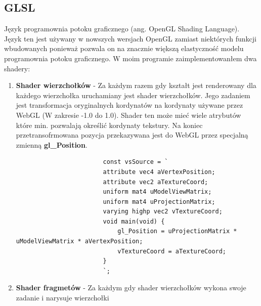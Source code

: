 \documentclass{article}
\begin{document}
        \subsection{GLSL}
            Język programownia potoku graficznego (ang. OpenGL Shading Language). Język ten jest używany w nowszych 
            wersjach OpenGL zamiast niektórych funkcji wbudowanych ponieważ pozwala on na znacznie większą elastyczność
            modelu programownia potoku graficznego. W moim programie zaimplementowanłem dwa shadery:
            \begin{enumerate}
                \item \textbf{Shader wierzchołków} - Za każdym razem gdy kształt jest renderowany dla każdego wierzchołka
                uruchamiany jest shader wierzchołków. Jego zadaniem jest transformacja oryginalnych kordynatów na kordynaty 
                używane przez WebGL (W zakresie -1.0 do 1.0). Shader ten może mieć wiele atrybutów które min. pozwalają 
                określić kordynaty tekstury. Na koniec przetransofrmowana pozycja przekazywana jest do WebGL przez specjalną
                zmienną \textbf{gl\_Position}.
                \begin{frame}
                    \scriptsize
                    \begin{verbatim}
                        const vsSource = `
                        attribute vec4 aVertexPosition;
                        attribute vec2 aTextureCoord;
                        uniform mat4 uModelViewMatrix;
                        uniform mat4 uProjectionMatrix;
                        varying highp vec2 vTextureCoord;
                        void main(void) {
                            gl_Position = uProjectionMatrix * uModelViewMatrix * aVertexPosition;
                            vTextureCoord = aTextureCoord;
                        }
                        `;
                    \end{verbatim}
                    \vspace{1em}
                    \label{lst:vsSource}
                \end{frame}
                \item \textbf{Shader fragmetów} - Za każdym gdy shader wierzchołków wykona swoje zadanie i narysuje wierzchołki

\end{enumerate}
\end{document}
